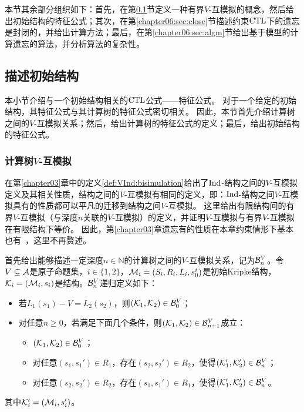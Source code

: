 本节其余部分组织如下：首先，在第\ref{chapter06:sec:des}节定义一种有界$V$-互模拟的概念，然后给出初始结构的特征公式；其次，在第\ref{chapter06:sec:close}节描述约束$\textrm{CTL}$下的遗忘是封闭的，并给出计算方法；最后，在第\ref{chapter06:sec:algm}节给出基于模型的计算遗忘的算法，并分析算法的复杂性。


\subsection{描述初始结构}\label{chapter06:sec:des}%
本小节介绍与一个初始结构相关的$\textrm{CTL}$公式——特征公式。
对于一个给定的初始结构，其特征公式与其计算树的特征公式密切相关。
因此，本节首先介绍计算树之间的$V$-互模拟关系；然后，给出计算树的特征公式的定义；最后，给出初始结构的特征公式。

\subsubsection{计算树$V$-互模拟}
在第\ref{chapter03}章中的定义\ref{def:VInd:bisimulation}给出了$\textrm{Ind}$-结构之间的$V$-互模拟定义及其相关性质，结构之间的$V$-互模拟有相同的定义，即：$\textrm{Ind}$-结构之间$V$-互模拟具有的性质都可以平凡的迁移到结构之间$V$-互模拟。
这里给出有限结构间的有界$V$-互模拟（与深度$n$关联的$V$-互模拟）的定义，并证明$V$-互模拟与有界$V$-互模拟在有限结构下等价。
因此，第\ref{chapter03}章遗忘有的性质在本章约束情形下基本也有~\cite{renyansfirstpaper}，这里不再赘述。

首先给出能够描述一定深度$n\in \mathbb{N}$的计算树之间的$V$-互模拟关系，记为${\cal B}_n^V$。令$V\subseteq {\cal A}$是原子命题集，$i\in \{1,2\}$，${\cal M}_i=(S_i,R_i,L_i,s_0^i)$是初始Kripke结构，${\cal K}_i=({\cal M}_i, s_i)$是结构。${\cal B}_n^V$递归定义如下：
\begin{itemize}
	\item 若$L_1(s_1)-V=L_2(s_2)$，则$({\cal K}_1,{\cal K}_2) \in {\cal B}_0^V$；
	\item 对任意$n\ge 0$，若满足下面几个条件，则$({\cal K}_1,{\cal K}_2)\in {\cal B}_{n+1}^V$成立：
	\begin{itemize}
		\item $({\cal K}_1,{\cal K}_2) \in {\cal B}_0^V$；
		\item 对任意$(s_1,s_1')\in R_1$，存在$(s_2,s_2')\in R_2$，使得$({\cal K}_1',{\cal K}_2') \in {\cal B}_n^V$；
		\item 对任意$(s_2,s_2')\in R_2$，存在$(s_1,s_1')\in R_1$，使得$({\cal K}_1',{\cal K}_2') \in {\cal B}_n^V$。
	\end{itemize}
\end{itemize}
其中${\cal K}_i'=({\cal M}_i,s_i')$。

